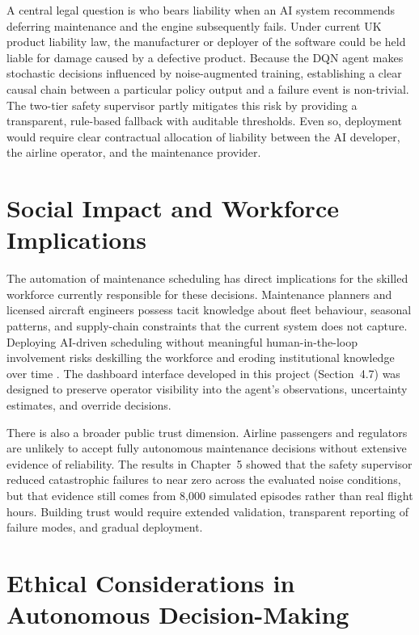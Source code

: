 \documentclass[12pt,a4paper]{report}
\begin{document}
A central legal question is who bears liability when an AI system recommends deferring maintenance and the engine subsequently fails. Under current UK product liability law, the manufacturer or deployer of the software could be held liable for damage caused by a defective product. Because the DQN agent makes stochastic decisions influenced by noise-augmented training, establishing a clear causal chain between a particular policy output and a failure event is non-trivial. The two-tier safety supervisor partly mitigates this risk by providing a transparent, rule-based fallback with auditable thresholds. Even so, deployment would require clear contractual allocation of liability between the AI developer, the airline operator, and the maintenance provider.

\section{Social Impact and Workforce Implications}

The automation of maintenance scheduling has direct implications for the skilled workforce currently responsible for these decisions. Maintenance planners and licensed aircraft engineers possess tacit knowledge about fleet behaviour, seasonal patterns, and supply-chain constraints that the current system does not capture. Deploying AI-driven scheduling without meaningful human-in-the-loop involvement risks deskilling the workforce and eroding institutional knowledge over time \citep{amodei2016concrete}. The dashboard interface developed in this project (Section~4.7) was designed to preserve operator visibility into the agent's observations, uncertainty estimates, and override decisions.

There is also a broader public trust dimension. Airline passengers and regulators are unlikely to accept fully autonomous maintenance decisions without extensive evidence of reliability. The results in Chapter~5 showed that the safety supervisor reduced catastrophic failures to near zero across the evaluated noise conditions, but that evidence still comes from 8,000 simulated episodes rather than real flight hours. Building trust would require extended validation, transparent reporting of failure modes, and gradual deployment.

\section{Ethical Considerations in Autonomous Decision-Making}
\end{document}
